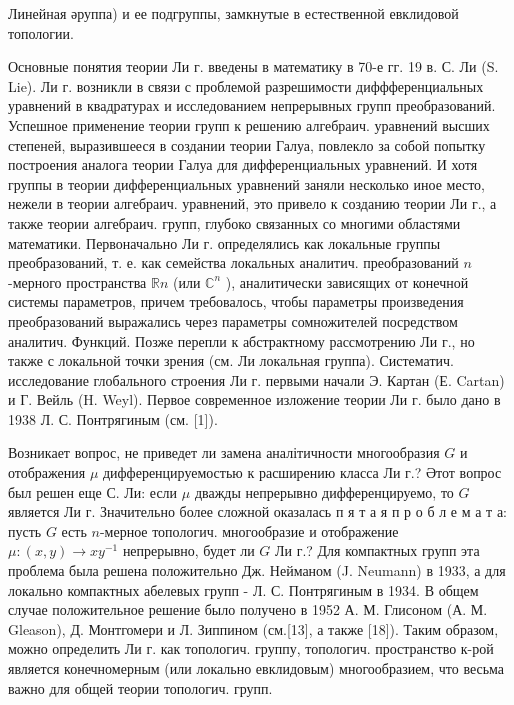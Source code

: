 \documentclass[10pt]{article}
\begin{document}
Линейная әруппа) и ее подгруппы, замкнутые в естественной евклидовой топологии.



Основные понятия теории Ли г. введены в математику в 70-е гг. 19 в. С. Ли (S. Lie). Ли г. возникли в связи с проблемой разрешимости диффференциальных уравнений в квадратурах и исследованием непрерывных групп преобразований. Успешное применение теории групп к решению алгебраич. уравнений высших степеней, выразившееся в создании теории Галуа, повлекло за собой попытку построения аналога теории Галуа для дифференциальных уравнений. И хотя группы в теории дифференциальных уравнений заняли несколько иное место, нежели в теории алгебраич. уравнений, это привело к созданию теории Ли г., а также теории алгебраич. групп, глубоко связанных со многими областями математики. Первоначально Ли г. определялись как локальные группы преобразований, т. е. как семейства локальных аналитич. преобразований $n$-мерного пространства $\mathbb{R} n$ (или $\mathbb{C}^{n}$ ), аналитически зависящих от конечной системы параметров, причем требовалось, чтобы параметры произведения преобразований выражались через параметры сомножителей посредством аналитич. Функций. Позже перепли к абстрактному рассмотрению Ли г., но также с локальной точки зрения (см. Ли локальная группа). Систематич. исследование глобального строения Ли г. первыми начали Э. Картан (Е. Cartan) и Г. Вейль (H. Weyl). Первое современное изложение теории Ли г. было дано в 1938 Л. С. Понтрягиным (см. [1]).



Возникает вопрос, не приведет ли замена аналітичности многообразия $G$ и отображения $\mu$ дифференцируемостью к расширению класса Ли г.? Әтот вопрос был решен еще С. Ли: если $\mu$ дважды непрерывно дифференцируемо, то $G$ является Ли г. Значительно более сложной оказалась п я т а я п р о б л е м а т а: пусть $G$ есть $n$-мерное топологич. многообразие и отображение $\mu:(x, y) \rightarrow x y^{-1}$ непрерывно, будет ли $G$ Ли г.? Для компактных групп эта проблема была решена положительно Дж. Нейманом (J. Neumann) в 1933, а для локально компактных абелевых групп - Л. С. Понтрягиным в 1934. В общем случае положительное решение было получено в 1952 А. М. Глисоном (А. М. Gleason), Д. Монтгомери и Л. Зиппином (см.[13], а также [18]). Таким образом, можно определить Ли г. как топологич. группу, топологич. пространство к-рой является конечномерным (или локально евклидовым) многообразием, что весьма важно для общей теории топологич. групп.
\end{document}
